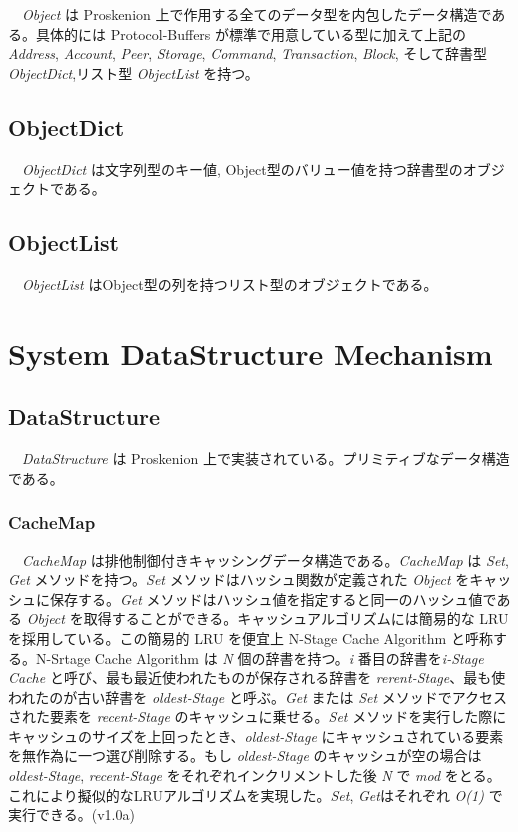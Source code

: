 　\emph{Object} は Proskenion
上で作用する全てのデータ型を内包したデータ構造である。具体的には
Protocol-Buffers が標準で用意している型に加えて上記の\emph{Address},
\emph{Account}, \emph{Peer}, \emph{Storage}, \emph{Command},
\emph{Transaction}, \emph{Block}, そして辞書型
\emph{ObjectDict},リスト型 \emph{ObjectList} を持つ。

\hypertarget{objectdict}{%
\subsection{ObjectDict}\label{objectdict}}

　\emph{ObjectDict} は文字列型のキー値,
Object型のバリュー値を持つ辞書型のオブジェクトである。

\hypertarget{objectlist}{%
\subsection{ObjectList}\label{objectlist}}

　\emph{ObjectList} はObject型の列を持つリスト型のオブジェクトである。

\hypertarget{system-datastructure-mechanism}{%
\section{System DataStructure
Mechanism}\label{system-datastructure-mechanism}}

\hypertarget{datastructure}{%
\subsection{DataStructure}\label{datastructure}}

　\emph{DataStructure} は Proskenion
上で実装されている。プリミティブなデータ構造である。

\hypertarget{cachemap}{%
\subsubsection{CacheMap}\label{cachemap}}

　\emph{CacheMap}
は排他制御付きキャッシングデータ構造である。\emph{CacheMap} は
\emph{Set}, \emph{Get} メソッドを持つ。\emph{Set}
メソッドはハッシュ関数が定義された \emph{Object}
をキャッシュに保存する。\emph{Get}
メソッドはハッシュ値を指定すると同一のハッシュ値である \emph{Object}
を取得することができる。キャッシュアルゴリズムには簡易的な LRU
を採用している。この簡易的 LRU を便宜上 N-Stage Cache Algorithm
と呼称する。N-Srtage Cache Algorithm は \emph{N}
個の辞書を持つ。\emph{i} 番目の辞書を\emph{i-Stage Cache}
と呼び、最も最近使われたものが保存される辞書を
\emph{rerent-Stage}、最も使われたのが古い辞書を \emph{oldest-Stage}
と呼ぶ。\emph{Get} または \emph{Set} メソッドでアクセスされた要素を
\emph{recent-Stage} のキャッシュに乗せる。\emph{Set}
メソッドを実行した際にキャッシュのサイズを上回ったとき、\emph{oldest-Stage}
にキャッシュされている要素を無作為に一つ選び削除する。もし
\emph{oldest-Stage} のキャッシュが空の場合は \emph{oldest-Stage},
\emph{recent-Stage} をそれぞれインクリメントした後 \emph{N} で
\emph{mod}
をとる。これにより擬似的なLRUアルゴリズムを実現した。\emph{Set},
\emph{Get}はそれぞれ \emph{O(1)} で実行できる。(v1.0a)

